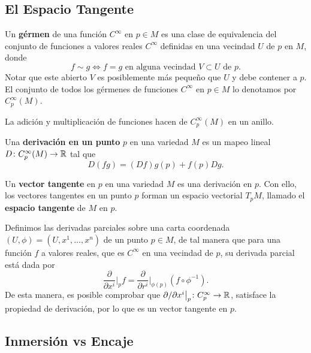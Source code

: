 \subsection{El Espacio Tangente}

\begin{definition}
	Un \textbf{gérmen} de una función $C^{\infty}$ en $p \in M$ es una clase de equivalencia del conjunto de funciones a valores reales $C^{\infty}$ definidas en una vecindad $U$ de $p$ en $M$, donde 
	\[ f \sim g \iff f = g \text{ en alguna vecindad } V \subset U \text{ de } p. \]
	Notar que este abierto $V$ es posiblemente más pequeño que $U$ y debe contener a $p$. El conjunto de todos los gérmenes de funciones $C^{\infty}$ en $p \in M$ lo denotamos por $C_{p}^{\infty}(M)$.
\end{definition}

La adición y multiplicación de funciones hacen de $C_{p}^{\infty}(M)$ en un anillo.

\begin{definition}
	Una \textbf{derivación en un punto} $p$ en una variedad $M$ es un mapeo lineal $D \colon C_{p}^{\infty}(M) \to \mathbb{R}$ tal que
	\[ D(fg) = (Df)g(p) + f(p) Dg. \]
\end{definition}

\begin{definition}
	Un \textbf{vector tangente} en $p$ en una variedad $M$ es una derivación en $p$. Con ello, los vectores tangentes en un punto $p$ forman un espacio vectorial $T_{p}M$, llamado el \textbf{espacio tangente} de $M$ en $p$.
\end{definition}

\begin{example}
	Definimos las derivadas parciales sobre una carta coordenada $(U,\phi) = (U,x^{1},\dots,x^{n})$ de un punto $p \in M$, de tal manera que para una función $f$ a valores reales, que es $C^{\infty}$ en una vecindad de $p$, su derivada parcial está dada por
	\[ \frac{\partial}{\partial x^{i}} \bigg|_{p} f = \frac{\partial}{\partial r^{i}} \bigg|_{\phi(p)} (f \circ \phi^{-1}). \]
	De esta manera, es posible comprobar que $\partial \slash \partial x^{i} \big|_{p} \colon C_{p}^{\infty} \to \mathbb{R}$, satisface la propiedad de derivación, por lo que es un vector tangente en $p$.
\end{example}

\subsection{Inmersión vs Encaje}
